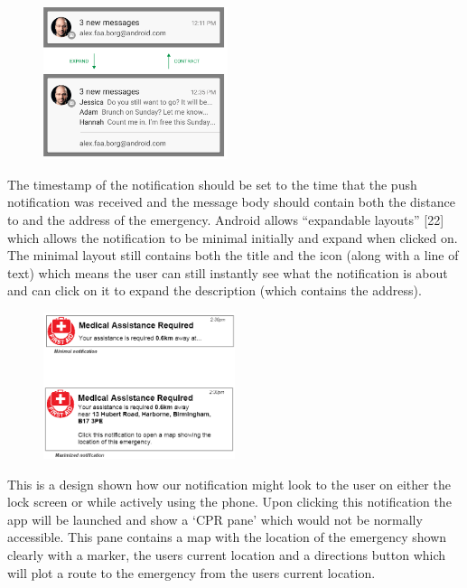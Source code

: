 \documentclass{article}
\begin{document}
\begin{figure}
  \begin{center}
  \vspace{-20pt}
    \includegraphics[width=0.48\textwidth]{"Iteration1/Android Notification Layout Extended"}
  \end{center}
\end{figure}
The timestamp of the notification should be set to the time that the push notification was received and the message body should contain both the distance to and the address of the emergency. Android allows “expandable layouts” [22] which allows the notification to be minimal initially and expand when clicked on. The minimal layout still contains both the title and the icon (along with a line of text) which means the user can still instantly see what the notification is about and can click on it to expand the description (which contains the address).\\

\begin{figure}
  \begin{center}
  \vspace{-20pt}
		\includegraphics[width=0.5\textwidth]{"Iteration1/Android Notification Design"}  \end{center}
\end{figure}
	This is a design shown how our notification might look to the user on either the lock screen or while actively using the phone. Upon clicking this notification the app will be launched and show a ‘CPR pane’ which would not be normally accessible. This pane contains a map with the location of the emergency shown clearly with a marker, the users current location and a directions button which will plot a route to the emergency from the users current location.\\
	
\end{document}
